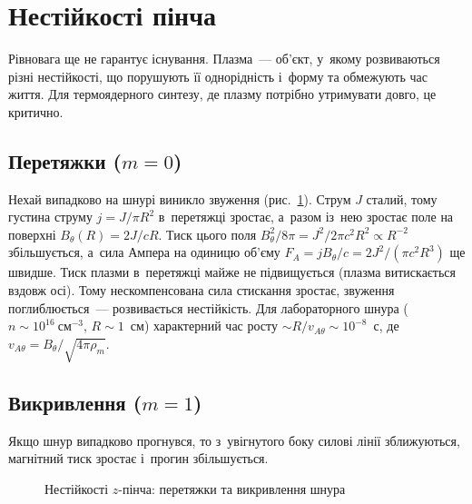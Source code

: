\section{Нестійкості пінча}



Рівновага ще не гарантує існування. Плазма~--- об'єкт, у~якому розвиваються різні
нестійкості, що порушують її однорідність і~форму та обмежують час життя. Для
термоядерного синтезу, де плазму потрібно утримувати довго, це критично.



\subsection{Перетяжки (\texorpdfstring{$m=0$}{m = 0})}



Нехай випадково на шнурі виникло звуження (рис.~\ref{pic:pinch-instability}). Струм $J$
сталий, тому густина струму $j=J/\pi R^2$ в~перетяжці зростає, а~разом із~нею зростає поле
на поверхні $B_\theta(R)=2J/cR$. Тиск цього поля $B_\theta^2/8\pi=J^2/2\pi c^2R^2\propto
R^{-2}$ збільшується, а~сила Ампера на одиницю об'єму $F_A=jB_\theta/c=2J^2/(\pi c^2R^3)$
ще швидше. Тиск плазми в~перетяжці майже не підвищується (плазма витискається вздовж осі).
Тому нескомпенсована сила стискання зростає, звуження поглиблюється~--- розвивається
нестійкість. Для лабораторного шнура ($n\sim10^{16}~\mathrm{см}^{-3}$, $R\sim1$~см)
характерний час росту $\sim R/v_{A\theta}\sim10^{-8}$~с, де
$v_{A\theta}=B_\theta/\sqrt{4\pi\rho_m}$.



\subsection{Викривлення (\texorpdfstring{$m=1$}{m = 1})}



Якщо шнур випадково прогнувся, то з~увігнутого боку силові лінії зближуються, магнітний
тиск зростає і~прогин збільшується.

\begin{figure}[h!]\centering
	\caption{Нестійкості $z$-пінча: перетяжки та викривлення шнура}
	\label{pic:pinch-instability}
\end{figure}



